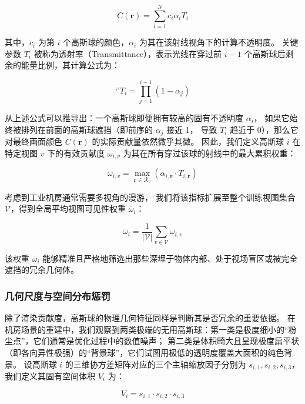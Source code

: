 \begin{equation}
    C(\mathbf{r}) = \sum_{i=1}^{N} c_i \alpha_i T_i
\end{equation}

其中，$c_i$ 为第 $i$ 个高斯球的颜色，$\alpha_i$ 为其在该射线视角下的计算不透明度。
关键参数 $T_i$ 被称为透射率（Transmittance），表示光线在穿过前 $i-1$ 个高斯球后剩余的能量比例，其计算公式为：

\begin{equation}‘
    ’T_i = \prod_{j=1}^{i-1}(1-\alpha_j)
\end{equation}

从上述公式可以推导出：一个高斯球即便拥有较高的固有不透明度 $\alpha_i$，
如果它始终被排列在前面的高斯球遮挡（即前序的 $\alpha_j$ 接近 1，
导致 $T_i$ 趋近于 0），那么它对最终画面颜色 $C(\mathbf{r})$ 的实际贡献量依然微乎其微。
因此，我们定义高斯球 $i$ 在特定视图 $v$ 下的有效贡献度 $\omega_{i,v}$ 为其在所有穿过该球的射线中的最大累积权重：

\begin{equation}
    \omega_{i,v} = \max_{\mathbf{r} \in \mathcal{R}_v} (\alpha_{i,\mathbf{r}} \cdot T_{i,\mathbf{r}})
\end{equation}

考虑到工业机房通常需要多视角的漫游，
我们将该指标扩展至整个训练视图集合 $\mathcal{V}$，得到全局平均视图可见性权重 $\overline{\omega}_i$：

\begin{equation}
    \overline{\omega}_i = \frac{1}{|\mathcal{V}|} \sum_{v \in \mathcal{V}} \omega_{i,v}
\end{equation}

该权重 $\overline{\omega}_i$ 能够精准且严格地筛选出那些深埋于物体内部、处于视场盲区或被完全遮挡的冗余几何体。

\subsubsection{几何尺度与空间分布惩罚}

除了渲染贡献度，高斯球的物理几何特征同样是判断其是否冗余的重要依据。
在机房场景的重建中，我们观察到两类极端的无用高斯球：第一类是极度细小的“粉尘点”，它们通常是优化过程中的数值噪声；
第二类是体积畸大且呈现极度扁平状（即各向异性极强）的“背景球”，它们试图用极低的透明度覆盖大面积的纯色背景。
设高斯球 $i$ 的三维协方差矩阵对应的三个主轴缩放因子分别为 $s_{i,1}, s_{i,2}, s_{i,3}$，我们定义其固有空间体积 $V_i$ 为：

\begin{equation}
    V_i = s_{i,1} \cdot s_{i,2} \cdot s_{i,3}
\end{equation}

